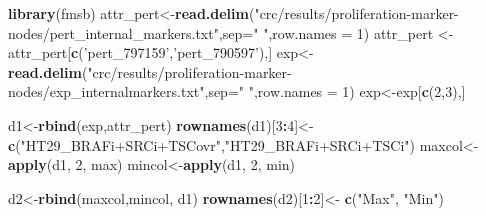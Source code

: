 \documentclass[
]{book}
\newenvironment{Shaded}{\begin{snugshade}}{\end{snugshade}}
\newcommand{\DataTypeTok}[1]{\textcolor[rgb]{0.13,0.29,0.53}{#1}}
\newcommand{\DecValTok}[1]{\textcolor[rgb]{0.00,0.00,0.81}{#1}}
\newcommand{\KeywordTok}[1]{\textcolor[rgb]{0.13,0.29,0.53}{\textbf{#1}}}
\newcommand{\NormalTok}[1]{#1}
\newcommand{\OperatorTok}[1]{\textcolor[rgb]{0.81,0.36,0.00}{\textbf{#1}}}
\newcommand{\StringTok}[1]{\textcolor[rgb]{0.31,0.60,0.02}{#1}}
\begin{document}
\begin{Shaded}
\begin{Highlighting}[]
\KeywordTok{library}\NormalTok{(fmsb)}
\NormalTok{attr_pert<-}\KeywordTok{read.delim}\NormalTok{(}\StringTok{"crc/results/proliferation-marker-nodes/pert_internal_markers.txt"}\NormalTok{,}\DataTypeTok{sep=}\StringTok{" "}\NormalTok{,}\DataTypeTok{row.names =} \DecValTok{1}\NormalTok{)}
\NormalTok{attr_pert <-attr_pert[}\KeywordTok{c}\NormalTok{(}\StringTok{'pert_797159'}\NormalTok{,}\StringTok{'pert_790597'}\NormalTok{),]}
\NormalTok{exp<-}\KeywordTok{read.delim}\NormalTok{(}\StringTok{"crc/results/proliferation-marker-nodes/exp_internalmarkers.txt"}\NormalTok{,}\DataTypeTok{sep=}\StringTok{" "}\NormalTok{,}\DataTypeTok{row.names =} \DecValTok{1}\NormalTok{)}
\NormalTok{exp<-exp[}\KeywordTok{c}\NormalTok{(}\DecValTok{2}\NormalTok{,}\DecValTok{3}\NormalTok{),]}

\NormalTok{d1<-}\KeywordTok{rbind}\NormalTok{(exp,attr_pert)}
\KeywordTok{rownames}\NormalTok{(d1)[}\DecValTok{3}\OperatorTok{:}\DecValTok{4}\NormalTok{]<-}\StringTok{ }\KeywordTok{c}\NormalTok{(}\StringTok{"HT29_BRAFi+SRCi+TSCovr"}\NormalTok{,}\StringTok{"HT29_BRAFi+SRCi+TSCi"}\NormalTok{)}
\NormalTok{maxcol<-}\KeywordTok{apply}\NormalTok{(d1, }\DecValTok{2}\NormalTok{, max)}
\NormalTok{mincol<-}\KeywordTok{apply}\NormalTok{(d1, }\DecValTok{2}\NormalTok{, min)}

\NormalTok{d2<-}\KeywordTok{rbind}\NormalTok{(maxcol,mincol, d1)}
\KeywordTok{rownames}\NormalTok{(d2)[}\DecValTok{1}\OperatorTok{:}\DecValTok{2}\NormalTok{]<-}\StringTok{ }\KeywordTok{c}\NormalTok{(}\StringTok{"Max"}\NormalTok{, }\StringTok{"Min"}\NormalTok{)}


\end{Highlighting}
\end{Shaded}
\end{document}
